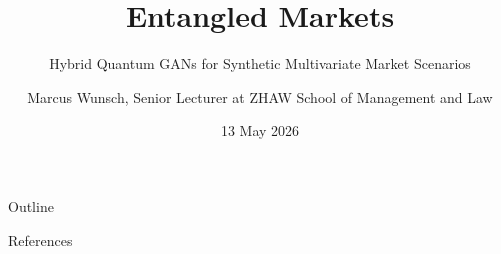 \documentclass[
10pt,
xcolor=x11names,
aspectratio=169,
]{beamer}
\title{Entangled Markets}
\subtitle{Hybrid Quantum GANs for Synthetic Multivariate Market Scenarios}
\author{Marcus Wunsch, Senior Lecturer at ZHAW School of Management and Law}
\date{13 May 2026}
\begin{document}
\frame[plain]{\titlepage}

\begin{frame}{Outline}
\tableofcontents
\end{frame}













\begin{frame}[allowframebreaks]{References}
\printbibliography
\end{frame}
\end{document}
